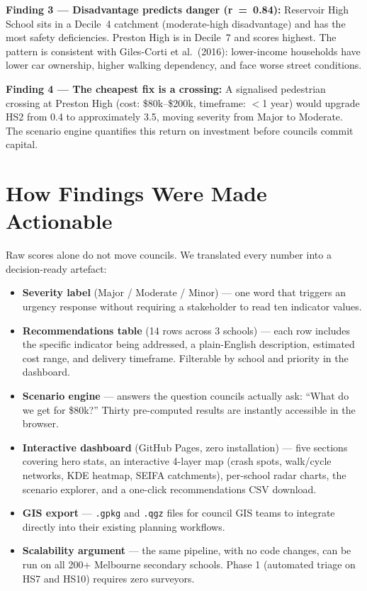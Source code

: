 \documentclass[11pt,a4paper]{article}
\begin{document}
\begin{insightbox}
\textbf{Finding 3 --- Disadvantage predicts danger (r~=~0.84):} Reservoir High School sits in a Decile~4 catchment (moderate-high disadvantage) and has the most safety deficiencies. Preston High is in Decile~7 and scores highest. The pattern is consistent with Giles-Corti et al.\ (2016): lower-income households have lower car ownership, higher walking dependency, and face worse street conditions.
\end{insightbox}

\begin{insightbox}
\textbf{Finding 4 --- The cheapest fix is a crossing:} A signalised pedestrian crossing at Preston High (cost: \$80k--\$200k, timeframe: $<$1 year) would upgrade HS2 from 0.4 to approximately 3.5, moving severity from Major to Moderate. The scenario engine quantifies this return on investment before councils commit capital.
\end{insightbox}

\section{How Findings Were Made Actionable}

Raw scores alone do not move councils. We translated every number into a decision-ready artefact:

\begin{itemize}
  \item \textbf{Severity label} (Major / Moderate / Minor) --- one word that triggers an urgency response without requiring a stakeholder to read ten indicator values.
  \item \textbf{Recommendations table} (14 rows across 3 schools) --- each row includes the specific indicator being addressed, a plain-English description, estimated cost range, and delivery timeframe. Filterable by school and priority in the dashboard.
  \item \textbf{Scenario engine} --- answers the question councils actually ask: ``What do we get for \$80k?'' Thirty pre-computed results are instantly accessible in the browser.
  \item \textbf{Interactive dashboard} (GitHub Pages, zero installation) --- five sections covering hero stats, an interactive 4-layer map (crash spots, walk/cycle networks, KDE heatmap, SEIFA catchments), per-school radar charts, the scenario explorer, and a one-click recommendations CSV download.
  \item \textbf{GIS export} --- \texttt{.gpkg} and \texttt{.qgz} files for council GIS teams to integrate directly into their existing planning workflows.
  \item \textbf{Scalability argument} --- the same pipeline, with no code changes, can be run on all 200+ Melbourne secondary schools. Phase 1 (automated triage on HS7 and HS10) requires zero surveyors.
\end{itemize}
\end{document}
